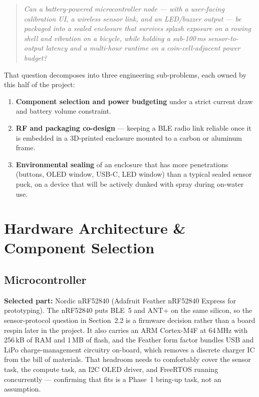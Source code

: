 \documentclass[11pt]{article}
\begin{document}
\begin{quote}
\emph{Can a battery-powered microcontroller node --- with a user-facing calibration UI, a wireless sensor link, and an LED/buzzer output --- be packaged into a sealed enclosure that survives splash exposure on a rowing shell and vibration on a bicycle, while holding a sub-100\,ms sensor-to-output latency and a multi-hour runtime on a coin-cell-adjacent power budget?}
\end{quote}

That question decomposes into three engineering sub-problems, each owned by this half of the project:
\begin{enumerate}[topsep=2pt,itemsep=2pt]
    \item \textbf{Component selection and power budgeting} under a strict current draw and battery volume constraint.
    \item \textbf{RF and packaging co-design} --- keeping a BLE radio link reliable once it is embedded in a 3D-printed enclosure mounted to a carbon or aluminum frame.
    \item \textbf{Environmental sealing} of an enclosure that has more penetrations (buttons, OLED window, USB-C, LED window) than a typical sealed sensor puck, on a device that will be actively dunked with spray during on-water use.
\end{enumerate}

\section{Hardware Architecture \& Component Selection}

\subsection{Microcontroller}
\textbf{Selected part:} Nordic nRF52840 (Adafruit Feather nRF52840 Express for prototyping). The nRF52840 puts BLE~5 and ANT+ on the same silicon, so the sensor-protocol question in Section~2.2 is a firmware decision rather than a board respin later in the project. It also carries an ARM Cortex-M4F at 64\,MHz with 256\,kB of RAM and 1\,MB of flash, and the Feather form factor bundles USB and LiPo charge-management circuitry on-board, which removes a discrete charger IC from the bill of materials. That headroom needs to comfortably cover the sensor task, the compute task, an I2C OLED driver, and FreeRTOS running concurrently --- confirming that fits is a Phase~1 bring-up task, not an assumption.
\end{document}
